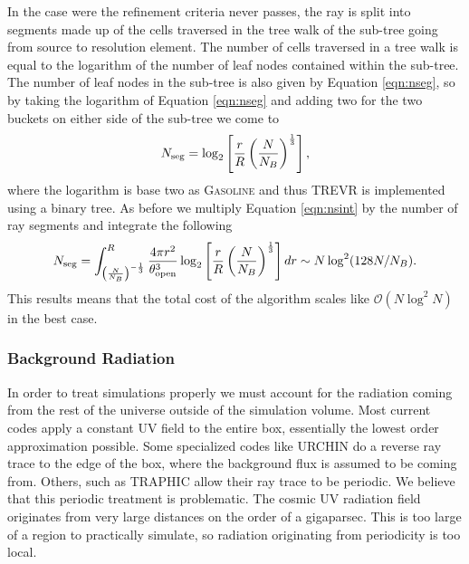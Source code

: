 \documentclass[fleq,usenatbib]{mnras}
\newcommand{\acro}{TREVR}
\newcommand{\bigO}[1]{\mathcal{O}\left(#1\right)}
\newcommand{\tO}{\theta_{\rm open}}
\begin{document}
In the case were the refinement criteria never passes, the ray is split into 
segments made up of the cells traversed in the tree walk of the sub-tree going 
from source to resolution element. The number of cells traversed in a tree walk
is equal to the logarithm of the number of leaf nodes contained within the 
sub-tree. The number of leaf nodes in the sub-tree is also given by Equation 
\ref{eqn:nseg}, so by taking the logarithm of Equation \ref{eqn:nseg} and 
adding two for the two buckets on either side of the sub-tree we come to
\begin{equation}
\label{eqn:nseg2}
N_{\rm seg} = \log_2\left[\frac{r}{R}\left(
\frac{N}{N_B}\right)^\frac{1}{3}\right],
\end{equation}
where the logarithm is base two as \textsc{Gasoline} and thus \acro{} is 
implemented using a binary tree. As before we multiply Equation 
\ref{eqn:nsint} by the number of ray segments and integrate the following
\begin{equation}
\label{eqn:nsegint2}
N_{\rm seg} = \int_{\left(\frac{N}{N_B}\right)^{-\frac{1}{3}}}^R 
\frac{4\pi r^2}{\tO^3}
\log_2\left[\frac{r}{R}\left(
\frac{N}{N_B}\right)^\frac{1}{3}\right] dr
\sim N\log^2(128 N/N_B).
\end{equation}
This results means that the total cost of the algorithm scales like 
$\bigO{N\log^2N}$ in the best case.

\subsubsection{Background Radiation}
In order to treat simulations properly we must account for the radiation 
coming from the rest of the universe outside of the simulation volume. Most 
current codes apply a constant UV field to the entire box, essentially the 
lowest order approximation possible. Some specialized codes like URCHIN 
\citep{altayTheuns13} do a reverse ray trace to the edge of the box, where the 
background flux is assumed to be coming from. Others, such as TRAPHIC 
\citep{pawlikSchaye08} allow their ray trace to be periodic. We believe
that this periodic treatment is problematic. The cosmic UV radiation field 
originates from very large distances on the order of a gigaparsec. This is too 
large of a region to practically simulate, so radiation originating from 
periodicity is too local.
\end{document}
